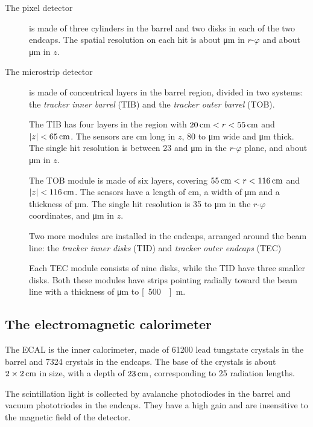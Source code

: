 \begin{description}
    \item[The pixel detector] is made of three cylinders in the barrel and
        two disks in each of the two endcaps. The spatial resolution on each
        hit is about \unit[10]{\micro m} in $r$-$\varphi$ and about
        \unit[20]{\micro m} in $z$.
    \item[The microstrip detector] is made of concentrical layers in the
        barrel region, divided in two systems: the \emph{tracker inner
        barrel} (TIB) and the \emph{tracker outer barrel} (TOB).

        The TIB has four layers in the region with $\unit[20]{cm} < r <
        \unit[55]{cm}$ and $|z| < \unit[65]{cm}$. The sensors are
        \unit[10]{cm} long in $z$, 80 to \unit[120]{\micro m} wide and
        \unit[320]{\micro m} thick. The single hit resolution is between 23
        and \unit[34]{\micro m} in the $r$-$\varphi$ plane, and about
        \unit[230]{\micro m} in $z$.

        The TOB module is made of six layers, covering
        $\unit[55]{cm} < r < \unit[116]{cm}$ and $|z| <
        \unit[116]{cm}$. The sensors have a length of \unit[25]{cm}, a width
        of \unit[180]{\micro m} and a thickness of \unit[500]{\micro m}. The
        single hit resolution is 35 to \unit[52]{\micro m} in the
        $r$-$\varphi$ coordinates, and \unit[530]{\micro m} in $z$.

        Two more modules are installed in the endcaps, arranged around the
        beam line: the \emph{tracker inner
        disks} (TID) and \emph{tracker outer endcaps} (TEC)

        Each TEC module consists of nine disks, while the TID have three
        smaller disks. Both these modules have strips pointing radially
        toward the beam line with a thickness of \unit[320]{\micro m} to
        \unit[500 \micro]{m}.
\end{description}

\subsection{The electromagnetic calorimeter}
The ECAL is the inner calorimeter, made of 61200 lead tungstate crystals in
the barrel and 7324 crystals in the endcaps.
The base of the crystals is about $\unit[2\times2]{cm}$ in size, with a
depth of $\unit[23]{cm}$, corresponding to 25 radiation lengths.

The scintillation light is collected by avalanche photodiodes in the barrel
and vacuum phototriodes in the endcaps. They have a high gain and are
insensitive to the magnetic field of the detector.

